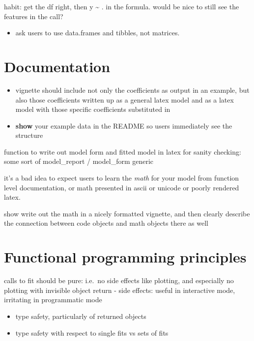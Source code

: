\documentclass[]{book}
\providecommand{\tightlist}{%
  \setlength{\itemsep}{0pt}\setlength{\parskip}{0pt}}
\theoremstyle{definition}
\theoremstyle{definition}
\theoremstyle{definition}
\theoremstyle{remark}
\begin{document}
habit: get the df right, then y \textasciitilde{} . in the formula.
would be nice to still see the features in the call?

\begin{itemize}
\tightlist
\item
  ask users to use data.frames and tibbles, not matrices.
\end{itemize}

\chapter{Documentation}\label{documentation}

\begin{itemize}
\item
  vignette should include not only the coefficients as output in an
  example, but also those coefficients written up as a general latex
  model and as a latex model with those specific coefficients
  substituted in
\item
  \textbf{show} your example data in the README so users immediately see
  the structure
\end{itemize}

function to write out model form and fitted model in latex for sanity
checking: some sort of model\_report / model\_form generic

it's a bad idea to expect users to learn the \emph{math} for your model
from function level documentation, or math presented in ascii or unicode
or poorly rendered latex.

show write out the math in a nicely formatted vignette, and then clearly
describe the connection between code objects and math objects there as
well

\chapter{Functional programming
principles}\label{functional-programming-principles}

calls to fit should be pure: i.e.~no side effects like plotting, and
especially no plotting with invisible object return - side effects:
useful in interactive mode, irritating in programmatic mode

\begin{itemize}
\tightlist
\item
  type safety, particularly of returned objects
\item
  type safety with respect to single fits vs sets of fits
\end{itemize}
\end{document}
